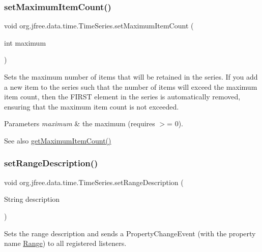 \subsubsection{\texorpdfstring{set\+Maximum\+Item\+Count()}{setMaximumItemCount()}}
{\footnotesize\ttfamily void org.\+jfree.\+data.\+time.\+Time\+Series.\+set\+Maximum\+Item\+Count (\begin{DoxyParamCaption}\item[{int}]{maximum }\end{DoxyParamCaption})}

Sets the maximum number of items that will be retained in the series. If you add a new item to the series such that the number of items will exceed the maximum item count, then the F\+I\+R\+ST element in the series is automatically removed, ensuring that the maximum item count is not exceeded.


\begin{DoxyParams}{Parameters}
{\em maximum} & the maximum (requires $>$= 0).\\
\hline
\end{DoxyParams}
\begin{DoxySeeAlso}{See also}
\mbox{\hyperlink{classorg_1_1jfree_1_1data_1_1time_1_1_time_series_abcbd350f6c7bcd4cad3405a457afff4d}{get\+Maximum\+Item\+Count()}} 
\end{DoxySeeAlso}
\mbox{\label{classorg_1_1jfree_1_1data_1_1time_1_1_time_series_a67fa8ee54ca85ec0e7b645d1464d11f5}} 
\subsubsection{\texorpdfstring{set\+Range\+Description()}{setRangeDescription()}}
{\footnotesize\ttfamily void org.\+jfree.\+data.\+time.\+Time\+Series.\+set\+Range\+Description (\begin{DoxyParamCaption}\item[{String}]{description }\end{DoxyParamCaption})}

Sets the range description and sends a {\ttfamily Property\+Change\+Event} (with the property name {\ttfamily \mbox{\hyperlink{classorg_1_1jfree_1_1data_1_1_range}{Range}}}) to all registered listeners.


